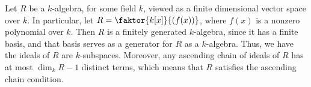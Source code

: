 \begin{example}\label{example_1.2}
     Let $R$ be a  $k$-algebra, for some field  $k$, viewed as a finite
     dimensional vector space over  $k$. In particular, let
     $R=\faktor{k[x]}{(f(x))}$, where $f(x)$ is a nonzero polynomial over $k$.
     Then  $R$ is a finitely generated  $k$-algebra, since it has a finite
     basis, and that basis serves as a generator for $R$ as a  $k$-algebra.
     Thus, we have the ideals of $R$ are $k$-subspaces. Moreover, any ascending
     chain of ideals of $R$ has at most  $\dim_k{R}-1$ distinct terms, which
     means that $R$ satisfies the ascending chain condition.
 \end{example}
